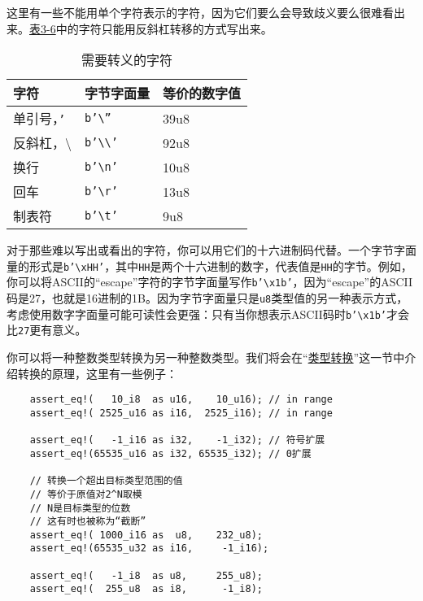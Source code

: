 这里有一些不能用单个字符表示的字符，因为它们要么会导致歧义要么很难看出来。\hyperref[t3-6]{表3-6}中的字符只能用反斜杠转移的方式写出来。
\begin{table}[htbp]
    \centering
    \caption{需要转义的字符}
    \label{t3-6}
    \begin{tabular}{lll}
        \hline
        \textbf{字符}   &   \textbf{字节字面量} & \textbf{等价的数字值} \\
        \hline
        单引号，\texttt{'}   &   \texttt{b'\textbackslash''}      & 39u8 \\
        \rowcolor{tablecolor}
        反斜杠，\textbackslash &    \texttt{b'\textbackslash\textbackslash'} & 92u8 \\
        换行        &    \texttt{b'\textbackslash n'}    & 10u8 \\
        \rowcolor{tablecolor}
        回车        &   \texttt{b'\textbackslash r'}     & 13u8 \\
        制表符      &   \texttt{b'\textbackslash t'}     & 9u8 \\
    \end{tabular}
\end{table}

对于那些难以写出或看出的字符，你可以用它们的十六进制码代替。一个字节字面量的形式是\texttt{b'\textbackslash xHH'}，其中\texttt{HH}是两个十六进制的数字，代表值是\texttt{HH}的字节。例如，你可以将ASCII的“escape”字符的字节字面量写作\texttt{b'\textbackslash x1b'}，因为“escape”的ASCII码是27，也就是16进制的1B。因为字节字面量只是\texttt{u8}类型值的另一种表示方式，考虑使用数字字面量可能可读性会更强：只有当你想表示ASCII码时\texttt{b'\textbackslash x1b'}才会比\texttt{27}更有意义。

你可以将一种整数类型转换为另一种整数类型。我们将会在“\hyperref[cast]{类型转换}”这一节中介绍转换的原理，这里有一些例子：
\begin{verbatim}
    assert_eq!(   10_i8  as u16,    10_u16); // in range
    assert_eq!( 2525_u16 as i16,  2525_i16); // in range

    assert_eq!(   -1_i16 as i32,    -1_i32); // 符号扩展
    assert_eq!(65535_u16 as i32, 65535_i32); // 0扩展

    // 转换一个超出目标类型范围的值
    // 等价于原值对2^N取模
    // N是目标类型的位数
    // 这有时也被称为“截断”
    assert_eq!( 1000_i16 as  u8,    232_u8);
    assert_eq!(65535_u32 as i16,     -1_i16);

    assert_eq!(   -1_i8  as u8,     255_u8);
    assert_eq!(  255_u8  as i8,      -1_i8);
\end{verbatim}

